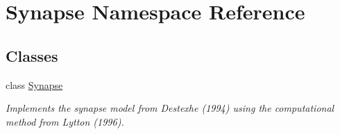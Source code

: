 \hypertarget{namespace_synapse}{\section{Synapse Namespace Reference}
\label{namespace_synapse}
}
\subsection*{Classes}
\begin{DoxyCompactItemize}
\item 
class \hyperlink{class_synapse_1_1_synapse}{Synapse}
\begin{DoxyCompactList}\small\item\em Implements the synapse model from Destexhe (1994) using the computational method from Lytton (1996). \end{DoxyCompactList}\end{DoxyCompactItemize}
